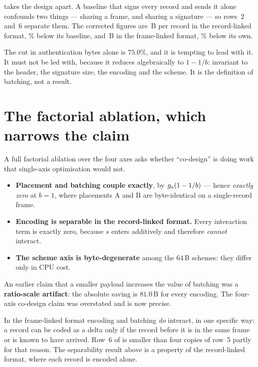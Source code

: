  takes the design apart. A baseline that signs every record and sends it alone
confounds two things --- sharing a frame, and sharing a signature --- so rows~2 and~6 separate
them. The corrected figures are \bprFirstDesign\,B per record in the record-linked format,
\saveFirst\% below its baseline, and \bprLeanDesign\,B in the frame-linked format, \saveLean\% below its
own.

\begin{remark}
The cut in authentication bytes alone is $75.0\%$, and it is tempting to lead with it. It must not
be led with, because it reduces algebraically to $1 - 1/b$: invariant to the header, the signature
size, the encoding and the scheme. It is the definition of batching, not a result.
\end{remark}


\section{The factorial ablation, which narrows the claim}

A full factorial ablation over the four axes asks whether ``co-design'' is doing work that
single-axis optimisation would not.

\begin{itemize}
\item \textbf{Placement and batching couple exactly}, by $g_a(1 - 1/b)$ --- hence \emph{exactly
      zero} at $b = 1$, where placements A and B are byte-identical on a single-record frame.
\item \textbf{Encoding is separable in the record-linked format.} Every interaction term is exactly zero,
      because $s$ enters additively and therefore \emph{cannot} interact.
\item \textbf{The scheme axis is byte-degenerate} among the $64$\,B schemes: they differ only in
      CPU cost.
\end{itemize}

An earlier claim that a smaller payload increases the value of batching was a \textbf{ratio-scale
artifact}: the absolute saving is $81.0$\,B for every encoding. The four-axis co-design claim was
overstated and is now precise.

\begin{remark}
In the frame-linked format encoding and batching \emph{do} interact, in one specific way: a record can be
coded as a delta only if the record before it is in the same frame or is known to have arrived.
Row~6 of  is smaller than four copies of row~5 partly for that reason. The
separability result above is a property of the record-linked format, where each record is encoded alone.
\end{remark}

